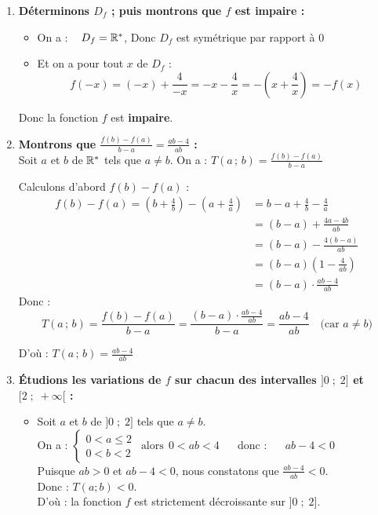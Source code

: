 \documentclass[10pt, a4paper]{article}
\begin{document}
\begin{Solution}[APPLICATION][12]
\begin{enumerate}[leftmargin=*,itemsep=0.5pt]
\item \textbf{Déterminons $D_f$ ; puis montrons que $f$ est impaire :}
\begin{itemize}[leftmargin=*,itemsep=1pt]
    \item On a : ~ $D_f = \mathbb{R}^*$, Donc $D_f$ est symétrique par rapport à $0$
    \item Et on a pour tout $x$ de $D_f$ :
    $$f(-x) = (-x) + \frac{4}{-x} 
          = -x - \frac{4}{x} 
          = -\left(x + \frac{4}{x}\right) 
          = -f(x)$$
\end{itemize}

Donc la fonction $f$ est \textbf{impaire}.

\item \textbf{Montrons que $\frac{f(b) - f(a)}{b - a} = \frac{ab - 4}{ab}$ :} \\
Soit $a$ et $b$ de $\mathbb{R}^*$ tels que $a \neq b$.
On a :  $T(a\,;\,b) = \frac{f(b) - f(a)}{b - a}$ 

Calculons d'abord $f(b) - f(a)$ :
\begin{align*}
    f(b) - f(a) = \left(b + \frac{4}{b}\right) - \left(a + \frac{4}{a}\right) 
                &= b - a + \frac{4}{b} - \frac{4}{a} \\
                &= (b - a) + \frac{4a - 4b}{ab} \\
                &= (b - a) - \frac{4(b - a)}{ab} \\
                &= (b - a)\left(1 - \frac{4}{ab}\right) \\
                &= (b - a) \cdot \frac{ab - 4}{ab}
\end{align*}
Donc : 
\[ T(a\,;\,b) = \frac{f(b) - f(a)}{b - a}
             = \frac{(b - a) \cdot \frac{ab - 4}{ab}}{b - a}
             = \frac{ab - 4}{ab} \quad \text{(car } a \neq b \text{)} \]

D'où : \quad $T(a\,;\,b) = \frac{ab - 4}{ab}$

\item \textbf{Étudions les variations de $f$ sur chacun des intervalles $\big]0 \;;\; 2\big]$ et $\big[2 \;;\; +\infty\big[$ :}
\begin{itemize}[leftmargin=*,itemsep=0.5pt]
    \item Soit $a$ et $b$ de $\big]0 \;;\; 2\big]$ tels que $a \neq b$. \\
On a :
$\begin{cases}
    0 < a \leq 2 \\
    0 < b < 2
\end{cases} ~~ \text{alors} ~~ 0 < ab < 4$ ~~ donc : ~~ $ab - 4 < 0$ \\
Puisque $ab > 0$ et $ab - 4 < 0$, nous constatons que $\frac{ab - 4}{ab} < 0$. \\
Donc : \quad $T(a;b) < 0$. \\
D'où : la fonction $f$ est strictement décroissante sur $\big]0 \;;\; 2\big]$.


\end{itemize}
\end{enumerate}
\end{Solution}
\end{document}
